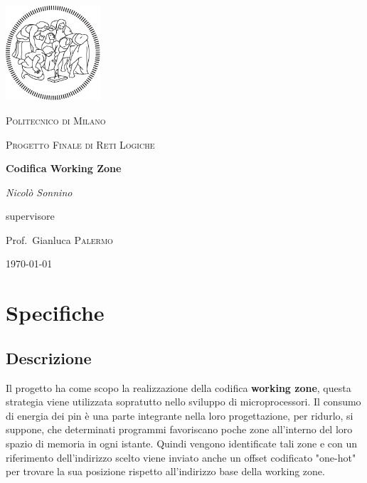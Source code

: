 \documentclass[12pt]{article}
\begin{document}
\begin{titlepage}
    \centering
    \includegraphics[width=100pt]{logo-polimi-new}\par\vspace{1cm}
    {\scshape\LARGE Politecnico di Milano \par}
    \vspace{1cm}
    {\scshape\Large Progetto Finale di Reti Logiche \par}
    \vspace{1.5cm}
    {\huge\bfseries Codifica Working Zone\par}
    \vspace{2cm}
    {\Large \textit{Nicolò Sonnino}\par}
    \vfill
    supervisore\par
    Prof.\ Gianluca \textsc{Palermo}
    \vfill
    {\large \today \par}
\end{titlepage}
\tableofcontents
\newpage
\section{Specifiche}
\subsection{Descrizione}
Il progetto ha come scopo la realizzazione della codifica \textbf{working zone}, questa strategia viene utilizzata sopratutto nello sviluppo di microprocessori.\newline
Il consumo di energia dei pin è una parte integrante nella loro progettazione, per ridurlo, si suppone, che determinati programmi favoriscano poche zone all'interno del loro spazio di memoria in ogni istante.\newline
Quindi vengono identificate tali zone e con un riferimento dell'indirizzo scelto viene inviato anche un offset codificato "one-hot" per trovare la sua posizione rispetto all'indirizzo base della working zone.\par
\end{document}
